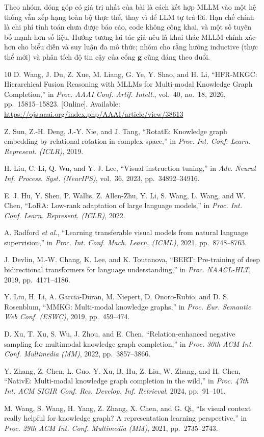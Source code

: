 \documentclass[11pt,a4paper]{article}
\begin{document}
Theo nhóm, đóng góp có giá trị nhất của bài là cách kết hợp MLLM vào một hệ thống vẫn xếp hạng toàn bộ thực thể, thay vì để LLM tự trả lời. Hạn chế chính là chi phí tính toán chưa được báo cáo, code không công khai, và một số tuyên bố mạnh hơn số liệu. Hướng tương lai tác giả nêu là khai thác MLLM chính xác hơn cho biểu diễn và suy luận đa mô thức; nhóm cho rằng hướng inductive (thực thể mới) và phân tích độ tin cậy của cổng $\mathbf{g}$ cũng đáng theo đuổi.

\renewcommand{\refname}{Tài liệu tham khảo (định dạng IEEE)}
\sloppy
\begin{thebibliography}{10}
\small
{} D. Wang, J. Du, Z. Xue, M. Liang, G. Ye, Y. Shao, and H. Li, ``HFR-MKGC: Hierarchical Fusion Reasoning with MLLMs for Multi-modal Knowledge Graph Completion,'' in \textit{Proc. AAAI Conf. Artif. Intell.}, vol.~40, no.~18, 2026, pp.~15815--15823. [Online]. Available: \url{https://ojs.aaai.org/index.php/AAAI/article/view/38613}

 Z. Sun, Z.-H. Deng, J.-Y. Nie, and J. Tang, ``RotatE: Knowledge graph embedding by relational rotation in complex space,'' in \textit{Proc. Int. Conf. Learn. Represent. (ICLR)}, 2019.

 H. Liu, C. Li, Q. Wu, and Y. J. Lee, ``Visual instruction tuning,'' in \textit{Adv. Neural Inf. Process. Syst. (NeurIPS)}, vol.~36, 2023, pp.~34892--34916.

 E. J. Hu, Y. Shen, P. Wallis, Z. Allen-Zhu, Y. Li, S. Wang, L. Wang, and W. Chen, ``LoRA: Low-rank adaptation of large language models,'' in \textit{Proc. Int. Conf. Learn. Represent. (ICLR)}, 2022.

 A. Radford \textit{et al.}, ``Learning transferable visual models from natural language supervision,'' in \textit{Proc. Int. Conf. Mach. Learn. (ICML)}, 2021, pp.~8748--8763.

 J. Devlin, M.-W. Chang, K. Lee, and K. Toutanova, ``BERT: Pre-training of deep bidirectional transformers for language understanding,'' in \textit{Proc. NAACL-HLT}, 2019, pp.~4171--4186.

 Y. Liu, H. Li, A. Garcia-Duran, M. Niepert, D. Onoro-Rubio, and D. S. Rosenblum, ``MMKG: Multi-modal knowledge graphs,'' in \textit{Proc. Eur. Semantic Web Conf. (ESWC)}, 2019, pp.~459--474.

 D. Xu, T. Xu, S. Wu, J. Zhou, and E. Chen, ``Relation-enhanced negative sampling for multimodal knowledge graph completion,'' in \textit{Proc. 30th ACM Int. Conf. Multimedia (MM)}, 2022, pp.~3857--3866.

 Y. Zhang, Z. Chen, L. Guo, Y. Xu, B. Hu, Z. Liu, W. Zhang, and H. Chen, ``NativE: Multi-modal knowledge graph completion in the wild,'' in \textit{Proc. 47th Int. ACM SIGIR Conf. Res. Develop. Inf. Retrieval}, 2024, pp.~91--101.

 M. Wang, S. Wang, H. Yang, Z. Zhang, X. Chen, and G. Qi, ``Is visual context really helpful for knowledge graph? A representation learning perspective,'' in \textit{Proc. 29th ACM Int. Conf. Multimedia (MM)}, 2021, pp.~2735--2743.
\end{thebibliography}
\end{document}

